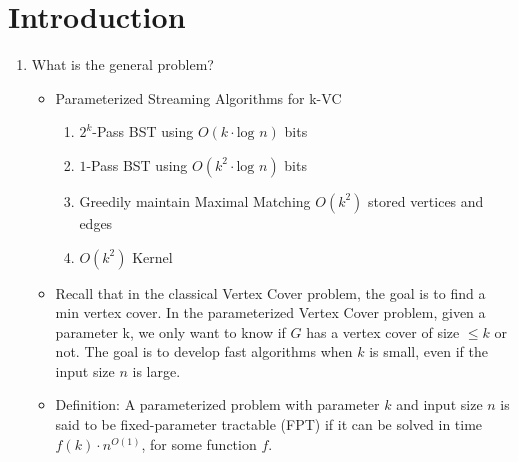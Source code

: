 \section{Introduction}



\begin{enumerate}
    \item What is the general problem?
    \begin{itemize}
        \item Parameterized Streaming Algorithms for k-VC
        \begin{enumerate}
            \item $2^k$-Pass BST using $O(k \cdot \text{log } n)$ bits
            \item $1$-Pass BST using $O(k^2 \cdot \text{log } n)$ bits
            \item Greedily maintain Maximal Matching $O(k^2)$ stored vertices and edges
            \item $O(k^2)$ Kernel
        \end{enumerate}
        \item {}Recall that in the classical Vertex Cover problem, the goal is to find a min vertex cover. In the parameterized Vertex Cover problem, given a parameter k, we only want to know if $G$ has a vertex cover of size $\leq k$ or not. The goal is to develop fast algorithms when $k$ is small, even if the input size $n$ is large.
        \item Definition: A parameterized problem with parameter $k$ and input size $n$ is said to be fixed-parameter tractable (FPT) if it can be solved in time $f(k) \cdot n^{O(1)}$, for some function $f$.

\end{itemize}
\end{enumerate}
